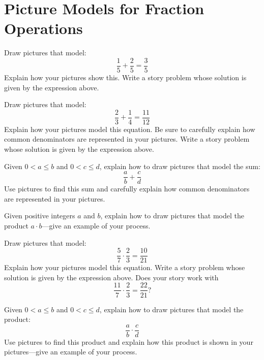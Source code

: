 \newpage
\section{Picture Models for Fraction Operations}\label{A:FO}


\begin{prob} 
Draw pictures that model:
\[
\frac{1}{5} + \frac{2}{5} = \frac{3}{5}
\]
Explain how your pictures show this. Write a story problem whose
solution is given by the expression above.
\end{prob}

\begin{prob} 
Draw pictures that model:
\[
\frac{2}{3} + \frac{1}{4} = \frac{11}{12}
\]
Explain how your pictures model this equation. Be sure to carefully
explain how common denominators are represented in your
pictures. Write a story problem whose solution is given by the
expression above.
\end{prob}

\begin{prob} 
Given $0<a\le b$ and $0<c\le d$, explain how to draw pictures
that model the sum:
\[
\frac{a}{b} + \frac{c}{d}
\]
Use pictures to find this sum and carefully explain how common
denominators are represented in your pictures.
\end{prob}

\begin{prob} 
Given positive integers $a$ and $b$, explain how to draw pictures that
model the product $a\cdot b$---give an example of your process.
\end{prob}

\begin{prob} 
Draw pictures that model:
\[
\frac{5}{7} \cdot \frac{2}{3} = \frac{10}{21}
\]
Explain how your pictures model this equation. Write a story problem
whose solution is given by the expression above. Does your story work with 
\[
\frac{11}{7} \cdot \frac{2}{3} = \frac{22}{21}?
\]
\end{prob}

\begin{prob} 
Given $0<a\le b$ and $0<c\le d$, explain how to draw pictures
that model the product:
\[
\frac{a}{b} \cdot \frac{c}{d}
\]
Use pictures to find this product and explain how this product is shown
in your pictures---give an example of your process.
\end{prob}
